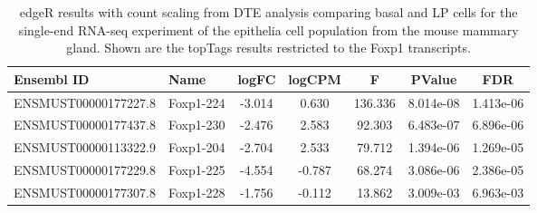 \begin{table}

\caption{\label{tab:r mouse_eda_se_dte_foxp1}edgeR results with count scaling from DTE analysis comparing basal and LP cells for the single-end RNA-seq experiment of the epithelia cell population from the mouse mammary gland. Shown are the topTags results restricted to the Foxp1 transcripts.}
\centering
\fontsize{10}{12}\selectfont
\begin{tabular}[t]{llccccc}
\toprule
Ensembl ID & Name & logFC & logCPM & F & PValue & FDR\\
\midrule
ENSMUST00000177227.8 & Foxp1-224 & -3.014 & 0.630 & 136.336 & 8.014e-08 & 1.413e-06\\
ENSMUST00000177437.8 & Foxp1-230 & -2.476 & 2.583 & 92.303 & 6.483e-07 & 6.896e-06\\
ENSMUST00000113322.9 & Foxp1-204 & -2.704 & 2.533 & 79.712 & 1.394e-06 & 1.269e-05\\
ENSMUST00000177229.8 & Foxp1-225 & -4.554 & -0.787 & 68.274 & 3.086e-06 & 2.386e-05\\
ENSMUST00000177307.8 & Foxp1-228 & -1.756 & -0.112 & 13.862 & 3.009e-03 & 6.963e-03\\
\bottomrule
\end{tabular}
\end{table}
